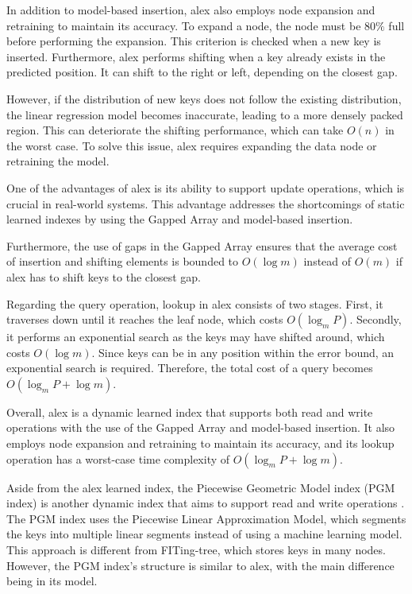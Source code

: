 In addition to model-based insertion, \acrshort{alex} also employs node expansion and retraining to maintain its accuracy. To expand a node, the node must be $80\%$ full before performing the expansion. This criterion is checked when a new key is inserted. Furthermore, \acrshort{alex} performs shifting when a key already exists in the predicted position. It can shift to the right or left, depending on the closest gap.

However, if the distribution of new keys does not follow the existing distribution, the linear regression model becomes inaccurate, leading to a more densely packed region. This can deteriorate the shifting performance, which can take $O(n)$ in the worst case. To solve this issue, \acrshort{alex} requires expanding the data node or retraining the model.

One of the advantages of \acrshort{alex} is its ability to support update operations, which is crucial in real-world systems. This advantage addresses the shortcomings of static learned indexes by using the \textsf{Gapped Array} and model-based insertion.

Furthermore, the use of gaps in the \textsf{Gapped Array} ensures that the average cost of insertion and shifting elements is bounded to $O(\log m)$ instead of $O(m)$ if \acrshort{alex} has to shift keys to the closest gap.

Regarding the query operation, lookup in \acrshort{alex} consists of two stages. First, it traverses down until it reaches the leaf node, which costs $O(\log_m P)$. Secondly, it performs an exponential search as the keys may have shifted around, which costs $O(\log m)$. Since keys can be in any position within the error bound, an exponential search is required. Therefore, the total cost of a query becomes $O(\log_m P + \log m)$.

Overall, \acrshort{alex} is a dynamic learned index that supports both read and write operations with the use of the \textsf{Gapped Array} and model-based insertion. It also employs node expansion and retraining to maintain its accuracy, and its lookup operation has a worst-case time complexity of $O(\log_m P + \log m)$.

Aside from the \acrshort{alex} learned index, the Piecewise Geometric Model index (PGM index) is another dynamic index that aims to support read and write operations \cite{PGM}. The PGM index uses the Piecewise Linear Approximation Model, which segments the keys into multiple linear segments instead of using a machine learning model. This approach is different from FITing-tree, which stores keys in many nodes. However, the PGM index's structure is similar to \acrshort{alex}, with the main difference being in its model.

